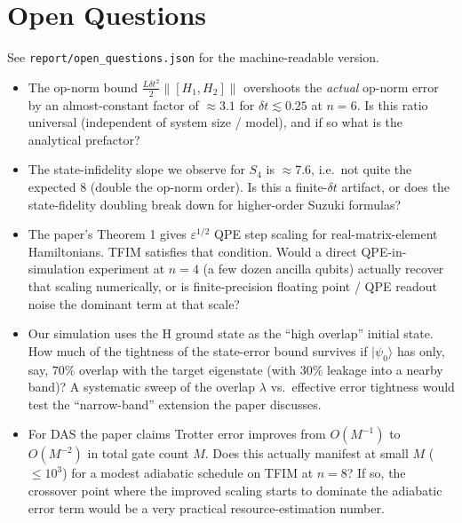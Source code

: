 \documentclass[11pt]{article}
\begin{document}
\section{Open Questions}
See \texttt{report/open\_questions.json} for the machine-readable version.
\begin{itemize}
  \item[\textbf{Q1.}] The op-norm bound $\tfrac{L\delta t^{2}}{2}\|[H_1,H_2]\|$
        overshoots the \emph{actual} op-norm error by an almost-constant
        factor of $\approx 3.1$ for $\delta t\!\lesssim\!0.25$ at $n\!=\!6$.
        Is this ratio universal (independent of system size / model), and if
        so what is the analytical prefactor?
  \item[\textbf{Q2.}] The state-infidelity slope we observe for $S_4$ is
        $\approx 7.6$, i.e.\ not quite the expected $8$ (double the op-norm
        order). Is this a finite-$\delta t$ artifact, or does the state-fidelity
        doubling break down for higher-order Suzuki formulas?
  \item[\textbf{Q3.}] The paper's Theorem 1 gives $\varepsilon^{1/2}$
        QPE step scaling for real-matrix-element Hamiltonians. TFIM
        satisfies that condition. Would a direct QPE-in-simulation
        experiment at $n\!=\!4$ (a few dozen ancilla qubits) actually recover
        that scaling numerically, or is finite-precision floating point / QPE
        readout noise the dominant term at that scale?
  \item[\textbf{Q4.}] Our simulation uses the H ground state as the ``high
        overlap'' initial state. How much of the tightness of the state-error
        bound survives if $|\psi_0\rangle$ has only, say, $70\%$ overlap
        with the target eigenstate (with $30\%$ leakage into a nearby band)?
        A systematic sweep of the overlap $\lambda$ vs.\ effective error
        tightness would test the ``narrow-band'' extension the paper discusses.
  \item[\textbf{Q5.}] For DAS the paper claims Trotter error improves from
        $O(M^{-1})$ to $O(M^{-2})$ in total gate count $M$. Does this
        actually manifest at small $M$ ($\!\le\!10^3$) for a modest adiabatic
        schedule on TFIM at $n\!=\!8$? If so, the crossover point where the
        improved scaling starts to dominate the adiabatic error term would be
        a very practical resource-estimation number.
\end{itemize}
\end{document}
